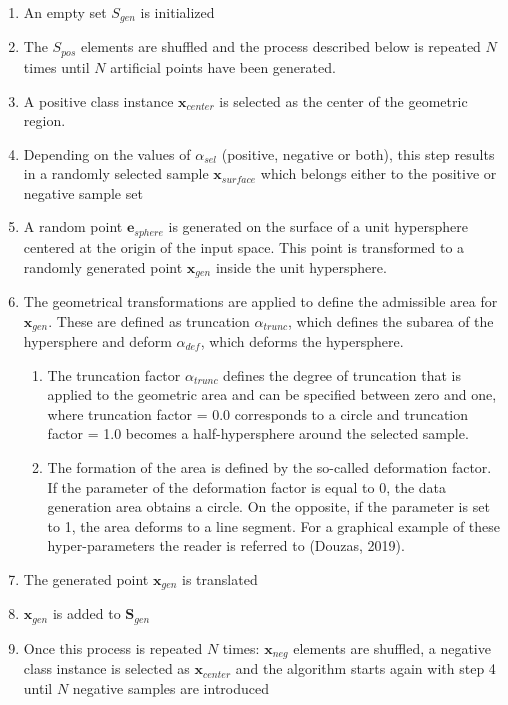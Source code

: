 \documentclass[parskip=full]{scrartcl}
\begin{document}
\begin{enumerate}
	\item 
	An empty set \( S_{gen} \) is initialized
	\item 
	The \( S_{pos} \) elements are shuffled and the process described 
	below is repeated \( N \) times until \( N \) artificial points 
	have been generated.
	\item 
	A positive class instance \( \textbf{x}_{center} \) is selected as the 
	center of the geometric region.
	\item 
	Depending on the values of \( \alpha_{sel} \) (positive, negative 
	or both), this step results in a randomly selected sample 
	\( \textbf{x}_{surface} \) which belongs either to the positive or negative 
	sample set
	\item 
	A random point \( \textbf{e}_{sphere} \) is generated on the surface of a 
	unit hypersphere centered at the origin of the input space. This point is 
	transformed to a randomly generated point \( \textbf{x}_{gen} \) inside the 
	unit hypersphere. 
	\item 
	The geometrical transformations are applied to define the admissible area 
	for \( \textbf{x}_{gen} \). These are defined as truncation 
	\( \alpha_{trunc} \), which defines the subarea of the hypersphere 
	and deform \( \alpha_{def} \), which deforms the hypersphere. 
	
	\begin{enumerate}[label=($\alph*$)]
		\item 
		The truncation factor \( \alpha_{trunc} \) defines the degree 
		of truncation that is applied to the geometric area and can be 
		specified between zero and one, where truncation factor = 0.0 
		corresponds to a circle and truncation factor = 1.0 becomes a 
		half-hypersphere around the selected sample. 
		
		\item 
		The formation of the area is defined by the so-called deformation 
		factor. If the parameter of the deformation factor is equal to 0, the 
		data generation area obtains a circle. On the opposite, if the 
		parameter is set to 1, the area deforms to a line segment. 
		For a graphical example of these hyper-parameters the reader is 
		referred to (Douzas, 2019).
	\end{enumerate}

	\item 
	The generated point \( \textbf{x}_{gen} \) is translated
	\item 
	\( \textbf{x}_{gen} \) is added to \( \textbf{S}_{gen} \)
	\item 
	Once this process is repeated \( N \) times: \( \textbf{x}_{neg} \) 
	elements are shuffled, a negative class instance is selected as 
	\( \textbf{x}_{center} \) and the algorithm starts again with step 4 until 
	\( N \) negative samples are introduced
\end{enumerate}
\end{document}
